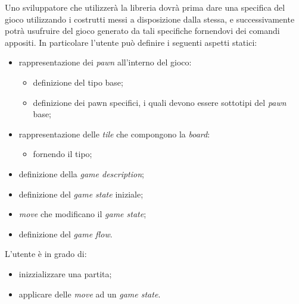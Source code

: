 Uno sviluppatore che utilizzerà la libreria dovrà prima dare una specifica del gioco utilizzando i costrutti messi a disposizione dalla stessa, e successivamente potrà usufruire del gioco generato da tali specifiche fornendovi dei comandi appositi.
%
In particolare l'utente può definire i seguenti aspetti statici:
%
\begin{itemize}
    \item rappresentazione dei \textit{pawn} all'interno del gioco:
    \begin{itemize}
        \item definizione del tipo base;
        \item definizione dei pawn specifici, i quali devono essere sottotipi del \textit{pawn} base;
    \end{itemize}
    \item rappresentazione delle \textit{tile} che compongono la \textit{board}:
    \begin{itemize}
        \item fornendo il tipo;
    \end{itemize}
    \item definizione della \textit{game description};
    \item definizione del \textit{game state} iniziale;
    \item \textit{move} che modificano il \textit{game state};
    \item definizione del \textit{game flow}.
\end{itemize}
%
L'utente è in grado di:
%
\begin{itemize}
    \item inizzializzare una partita;
    \item applicare delle \textit{move} ad un \textit{game state}.
\end{itemize}


